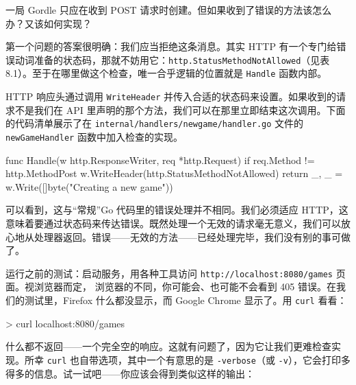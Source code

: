 一局 Gordle 只应在收到 POST 请求时创建。但如果收到了错误的方法该怎么办？又该如何实现？

第一个问题的答案很明确：我们应当拒绝这条消息。其实 HTTP 有一个专门给错误动词准备的状态码，那就不妨用它：\texttt{http.StatusMethodNotAllowed}（见表 8.1）。至于在哪里做这个检查，唯一合乎逻辑的位置就是 \texttt{Handle} 函数内部。

HTTP 响应头通过调用 \texttt{WriteHeader} 并传入合适的状态码来设置。如果收到的请求不是我们在 API 里声明的那个方法，我们可以在那里立即结束这次调用。下面的代码清单展示了在 \texttt{internal/handlers/newgame/handler.go} 文件的 \texttt{newGameHandler} 函数中加入检查的实现。

\begin{gocode}[title={代码清单 8.7 \texttt{handler.go}：拒绝使用错误方法的请求}]
func Handle(w http.ResponseWriter, req *http.Request) {
    if req.Method != http.MethodPost {
        w.WriteHeader(http.StatusMethodNotAllowed)
        return
    }
    _, _ = w.Write([]byte("Creating a new game"))
}
\end{gocode}

可以看到，这与``常规''Go 代码里的错误处理并不相同。我们必须适应 HTTP，这意味着要通过状态码来传达错误。既然处理一个无效的请求毫无意义，我们可以放心地从处理器返回。错误——无效的方法——已经处理完毕，我们没有别的事可做了。

运行之前的测试：启动服务，用各种工具访问 \texttt{http://localhost:8080/games} 页面。视浏览器而定， 浏览器的不同，你可能会、也可能不会看到 405 错误。在我们的测试里，Firefox 什么都没显示，而 Google Chrome 显示了。用 \texttt{curl} 看看：

\begin{shellcode}[]
> curl localhost:8080/games
\end{shellcode}

什么都不返回——一个完全空的响应。这就有问题了，因为它让我们更难检查实现。所幸 \texttt{curl} 也自带选项，其中一个有意思的是 \texttt{-\-verbose}（或 \texttt{-v}），它会打印多得多的信息。试一试吧——你应该会得到类似这样的输出：


